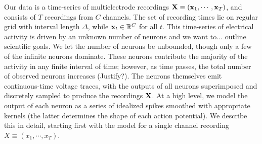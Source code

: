 
Our data is a time-series of multielectrode recordings $\mathbf{X} \equiv (\mathbf{x}_1, \cdots, \mathbf{x}_T)$, and consists of $T$ recordings from $C$ channels. 
The set of recording times lie on regular grid with interval length $\Delta$, while $\mathbf{x}_t \in \mathbb{R}^C$ for all $t$. 
This time-series of electrical activity is driven by an unknown number of neurons {\color{red} and we want to... outline scientific goals}. 
We let the number of neurons be unbounded, though only a few of the infinite
neurons dominate. These neurons contribute the majority of the activity in any finite interval of time; however, as time passes, the total number of 
observed neurons increases {\color{red}(Justify?)}. 
The neurons themselves emit continuous-time voltage traces, with the outputs of all neurons superimposed and discretely sampled to produce the 
recordings $\mathbf{X}$.  At a high level, we model the output of each neuron as a
series of idealized spikes smoothed with appropriate kernels (the latter determines the shape of each action potential). 
We describe this in detail, starting first with the model for a single channel recording $X \equiv (x_1, \cdots, x_T)$.


